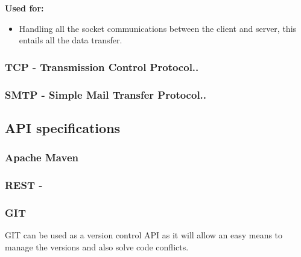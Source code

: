 \documentclass[a4paper]{article}
\begin{document}
\textbf{Used for:	}
\begin{itemize}
	\item{Handling all the socket communications between the client and server, this entails all the data transfer.}

\end{itemize}
\subsubsection{TCP - Transmission Control Protocol..}

\subsubsection{SMTP - Simple Mail Transfer Protocol..}


\subsection{API specifications}
\subsubsection{Apache Maven}

\subsubsection{REST -}


\subsubsection{GIT}
GIT can be used as a version control API as it will allow an easy means to manage the versions and also solve code conflicts.




%
\end{document}
